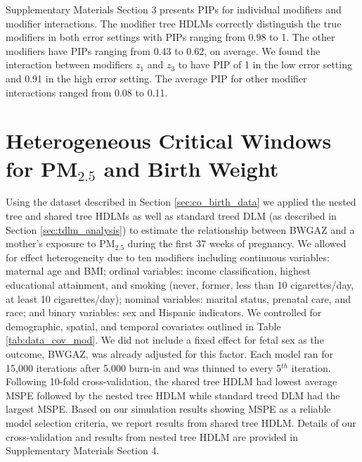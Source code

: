 \documentclass[12pt]{article}
\begin{document}
Supplementary Materials Section 3 presents PIPs for individual modifiers and modifier interactions. The modifier tree HDLMs correctly distinguish the true modifiers in both error settings with PIPs ranging from 0.98 to 1. The other modifiers have PIPs ranging from 0.43 to 0.62, on average. We found the interaction between modifiers $z_1$ and $z_3$ to have PIP of 1 in the low error setting and 0.91 in the high error setting. The average PIP for other modifier interactions ranged from 0.08 to 0.11.


\section{Heterogeneous Critical Windows for PM$_{2.5}$ and Birth Weight}\label{sec:data_analysis}


Using the dataset described in Section \ref{sec:co_birth_data} we applied the nested tree and shared tree HDLMs as well as standard treed DLM (as described in Section \ref{sec:tdlm_analysis}) to estimate the relationship between BWGAZ and a mother's exposure to PM$_{2.5}$ during the first 37 weeks of pregnancy. We allowed for effect heterogeneity due to ten modifiers including continuous variables: maternal age and BMI; ordinal variables: income classification, highest educational attainment, and smoking (never, former, less than 10 cigarettes/day, at least 10 cigarettes/day); nominal variables: marital status, prenatal care, and race; and binary variables: sex and Hispanic indicators. We controlled for demographic, spatial, and temporal covariates outlined in Table \ref{tab:data_cov_mod}. We did not include a fixed effect for fetal sex as the outcome, BWGAZ, was already adjusted for this factor. Each model ran for 15,000 iterations after 5,000 burn-in and was thinned to every 5$^{th}$ iteration. Following 10-fold cross-validation, the shared tree HDLM had lowest average MSPE followed by the nested tree HDLM while standard treed DLM had the largest MSPE. Based on our simulation results showing MSPE as a reliable model selection criteria, we report results from shared tree HDLM. Details of our cross-validation and results from nested tree HDLM are provided in Supplementary Materials Section 4.
\end{document}
